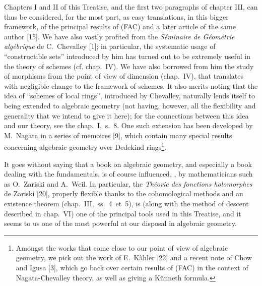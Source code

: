 \documentclass[../main.tex]{subfiles}
\begin{document}
Chapters I and II of this Treatise, and the first two paragraphs of chapter III, can thus be considered, for the most part, as easy translations, in this bigger framework, of the principal results of (FAC) and a later article of the same author [15].
We have also vastly profited from the \emph{Séminaire de Géométrie algébrique} de C.~Chevalley [1]; in particular, the systematic usage of ``constructible sets'' introduced by him has turned out to be extremely useful in the theory of schemes (cf. chap.~IV).
We have also borrowed from him the study of morphisms from the point of view of dimension (chap.~IV), that translates with negligible change to the framework of schemes.
It also merits noting that the idea of ``schemes of local rings'', introduced by Chevalley, naturally lends itself to being extended to algebraic geometry (not having, however, all the flexibility and generality that we intend to give it here); for the connections between this idea and our theory, see the chap.~I,~s.~8.
One such extension has been developed by M.~Nagata in a series of memoires [9], which contain many special results concerning algebraic geometry over Dedekind rings\footnote[1]{Amongst the works that come close to our point of view of algebraic geometry, we pick out the work of E.~Kàhler [22] and a recent note of Chow and Igusa [3], which go back over certain results of (FAC) in the context of Nagata-Chevalley theory, as well as giving a Künneth formula.}.

\asttri

It goes without saying that a book on algebraic geometry, and especially a book dealing with the fundamentals, is of course influenced, \completelyunsure, by mathematicians such as O.~Zariski and A.~Weil.
In particular, the \emph{Théorie des fonctions holomorphes} de Zariski [20], properly flexible thanks to the cohomological methods and an existence theorem (chap.~III,~ss.~4~et~5), is (along with the method of descent described in chap.~VI) one of the principal tools used in this Treatise, and it seems to us one of the most powerful at our disposal in algebraic geometry.
\end{document}
